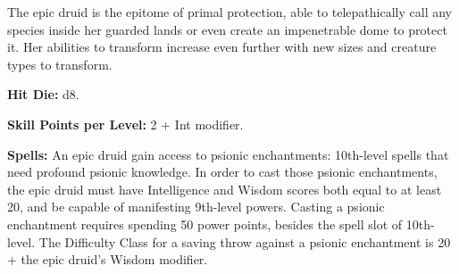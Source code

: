 The epic druid is the epitome of primal protection, able to telepathically call any species inside her guarded lands or even create an impenetrable dome to protect it. Her abilities to transform increase even further with new sizes and creature types to transform.


\textbf{Hit Die:} d8.

\textbf{Skill Points per Level:} 2 + Int modifier.

\textbf{Spells:} An epic druid gain access to psionic enchantments: 10th-level spells that need profound psionic knowledge. In order to cast those psionic enchantments, the epic druid must have Intelligence and Wisdom scores both equal to at least 20, and be capable of manifesting 9th-level powers. Casting a psionic enchantment requires spending 50 power points, besides the spell slot of 10th-level. The Difficulty Class for a saving throw against a psionic enchantment is 20 + the epic druid's Wisdom modifier.

